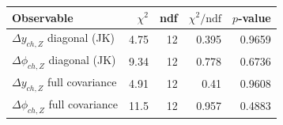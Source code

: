 \begin{tabular}{|l|r|r|r|r|}
\hline
Observable & $\chi^2$ & ndf & $\chi^2/\mathrm{ndf}$ & $p$-value \\
\hline
$\Delta y_{ch,Z}$ diagonal (JK) & 4.75 & 12 & 0.395 & 0.9659 \\
$\Delta\phi_{ch,Z}$ diagonal (JK) & 9.34 & 12 & 0.778 & 0.6736 \\
$\Delta y_{ch,Z}$ full covariance & 4.91 & 12 & 0.41 & 0.9608 \\
$\Delta\phi_{ch,Z}$ full covariance & 11.5 & 12 & 0.957 & 0.4883 \\
\hline
\end{tabular}
